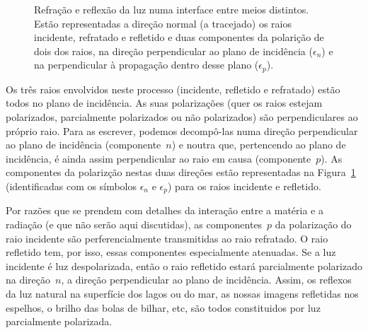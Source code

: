 \begin{figure}[htb]
{\par
}
\caption{Refração e reflexão da luz numa interface entre meios distintos. Estão
representadas a direção normal (a tracejado) os raios incidente, refratado e
refletido e duas componentes da polarição de dois dos raios, na direção
perpendicular ao plano de incidência ($\epsilon_n$) e na perpendicular à
propagação dentro desse plano ($\epsilon_p$).\label{fig:rfl_rfr}}
\end{figure}
Os três raios envolvidos neste processo (incidente, refletido e refratado) estão
todos no plano de incidência. As suas polarizações (quer os raios estejam
polarizados, parcialmente polarizados ou não polarizados) são perpendiculares ao
próprio raio. Para as escrever, podemos decompô-las numa direção perpendicular
ao plano de incidência (componente~$n$) e noutra que, pertencendo ao plano de
incidência, é ainda assim perpendicular ao raio em causa (componente~$p$). As
componentes da polarizção nestas duas direções estão representadas na
Figura~\ref{fig:rfl_rfr} (identificadas com os símbolos $\epsilon_n$ e
$\epsilon_p$) para os raios incidente e refletido.

Por razões que se prendem com detalhes da interação entre a matéria e a radiação
(e que não serão aqui discutidas), as componentes~$p$ da polarização do raio
incidente são perferencialmente transmitidas ao raio refratado. O raio refletido
tem, por isso, essas componentes especialmente atenuadas. Se a luz incidente é
luz despolarizada, então o raio refletido estará parcialmente polarizado
na direção~$n$, a direção perpendicular ao plano de incidência. Assim, os
reflexos da luz natural na superfície dos lagos ou do mar, as nossas imagens
refletidas nos espelhos, o brilho das bolas de bilhar, etc, são todos
constituidos por luz parcialmente polarizada.

